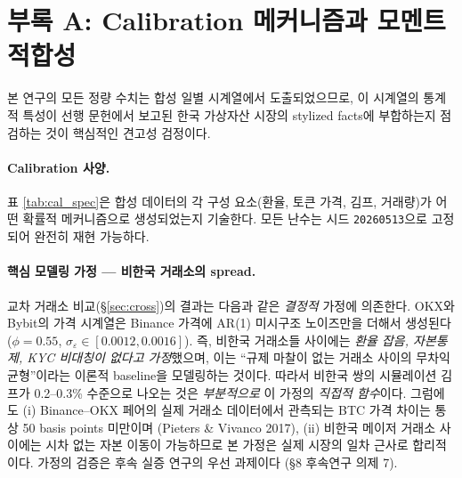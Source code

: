 \documentclass[11pt,a4paper]{article}
\begin{document}
\appendix
\section{부록 A: Calibration 메커니즘과 모멘트 적합성}
\label{app:calibration}

본 연구의 모든 정량 수치는 합성 일별 시계열에서 도출되었으므로,
이 시계열의 통계적 특성이 선행 문헌에서 보고된 한국 가상자산 시장의
stylized facts에 부합하는지 점검하는 것이 핵심적인 견고성 검정이다.

\paragraph{Calibration 사양.}
표 \ref{tab:cal_spec}은 합성 데이터의 각 구성 요소(환율, 토큰 가격, 김프, 거래량)가
어떤 확률적 메커니즘으로 생성되었는지 기술한다. 모든 난수는 시드 \texttt{20260513}으로
고정되어 완전히 재현 가능하다.

\paragraph{핵심 모델링 가정 --- 비한국 거래소의 spread.}
교차 거래소 비교(\S\ref{sec:cross})의 결과는 다음과 같은 \emph{결정적} 가정에 의존한다.
OKX와 Bybit의 가격 시계열은 Binance 가격에 AR(1) 미시구조 노이즈만을 더해서 생성된다
($\phi=0.55$, $\sigma_{\varepsilon}\in[0.0012, 0.0016]$). 즉, 비한국 거래소들 사이에는
\emph{환율 잡음, 자본통제, KYC 비대칭이 없다고 가정}했으며, 이는 ``규제 마찰이 없는
거래소 사이의 무차익 균형''이라는 이론적 baseline을 모델링하는 것이다. 따라서 비한국
쌍의 시뮬레이션 김프가 0.2--0.3\% 수준으로 나오는 것은 \emph{부분적으로} 이 가정의
\emph{직접적 함수}이다. 그럼에도 (i) Binance--OKX 페어의 실제 거래소 데이터에서
관측되는 BTC 가격 차이는 통상 50 basis points 미만이며 (Pieters \& Vivanco 2017),
(ii) 비한국 메이저 거래소 사이에는 시차 없는 자본 이동이 가능하므로 본 가정은
실제 시장의 일차 근사로 합리적이다. 가정의 검증은 후속 실증 연구의 우선 과제이다
(\S8 후속연구 의제 7).
\end{document}
